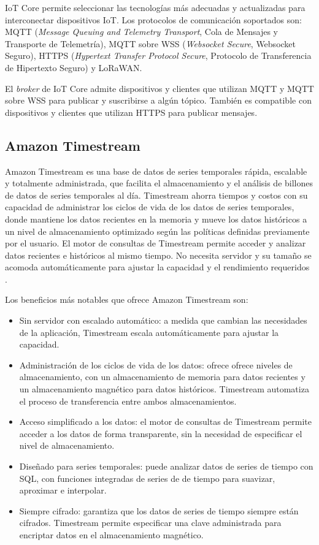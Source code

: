 IoT Core permite seleccionar las tecnologías más adecuadas y actualizadas para interconectar dispositivos IoT. Los protocolos de comunicación soportados son: MQTT (\textit{Message Queuing and Telemetry Transport}, Cola de Mensajes y Transporte de Telemetría), MQTT sobre WSS (\textit{Websocket Secure}, Websocket Seguro), HTTPS (\textit{Hypertext Transfer Protocol Secure}, Protocolo de Transferencia de Hipertexto Seguro) y LoRaWAN.

El \textit{broker} de IoT Core admite dispositivos y clientes que utilizan MQTT y MQTT sobre WSS para publicar y suscribirse a algún tópico. También es compatible con dispositivos y clientes que utilizan HTTPS para publicar mensajes.

\subsection{Amazon Timestream}
Amazon Timestream es una base de datos de series temporales rápida, escalable y totalmente administrada, que facilita el almacenamiento y el análisis de billones de datos de series temporales al día. Timestream ahorra tiempos y costos con su capacidad de administrar los ciclos de vida de los datos de series temporales, donde mantiene los datos recientes en la memoria y mueve los datos históricos a un nivel de almacenamiento optimizado según las políticas definidas previamente por el usuario. El motor de consultas de Timestream permite acceder y analizar datos recientes e históricos al mismo tiempo. No necesita servidor y su tamaño se acomoda automáticamente para ajustar la capacidad y el rendimiento requeridos \cite{timestream_info}.

Los beneficios más notables que ofrece Amazon Timestream son:
\begin{itemize}
	\item Sin servidor con escalado automático: a medida que cambian las necesidades de la aplicación, Timestream escala automáticamente para ajustar la capacidad.
	\item Administración de los ciclos de vida de los datos: ofrece ofrece niveles de almacenamiento, con un almacenamiento de memoria para datos recientes y un almacenamiento magnético para datos históricos. Timestream automatiza el proceso de transferencia entre ambos almacenamientos.
	\item Acceso simplificado a los datos: el motor de consultas de Timestream permite acceder a los datos de forma transparente, sin la necesidad de especificar el nivel de almacenamiento.
	\item Diseñado para series temporales: puede analizar datos de series de tiempo con SQL, con funciones integradas de series de de tiempo para suavizar, aproximar e interpolar.
	\item Siempre cifrado: garantiza que los datos de series de tiempo siempre están cifrados. Timestream permite especificar una clave administrada para encriptar datos en el almacenamiento magnético.
	
\end{itemize}

